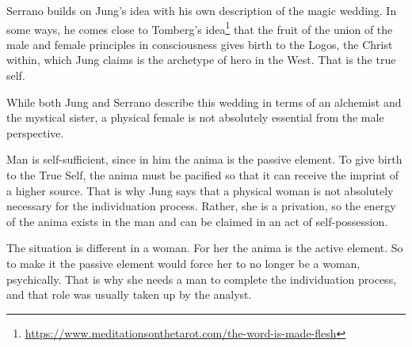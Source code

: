 Serrano builds on Jung's idea with his own description of the magic wedding. In some ways, he comes close to Tomberg's idea\footnote{\url{https://www.meditationsonthetarot.com/the-word-is-made-flesh}} that the fruit of the union of the male and female principles in consciousness gives birth to the Logos, the Christ within, which Jung claims is the archetype of hero in the West. That is the true self.

While both Jung and Serrano describe this wedding in terms of an alchemist and the mystical sister, a physical female is not absolutely essential from the male perspective.

Man is self-sufficient, since in him the anima is the passive element. To give birth to the True Self, the anima must be pacified so that it can receive the imprint of a higher source. That is why Jung says that a physical woman is not absolutely necessary for the individuation process. Rather, she is a privation, so the energy of the anima exists in the man and can be claimed in an act of self-possession.

The situation is different in a woman. For her the anima is the active element. So to make it the passive element would force her to no longer be a woman, psychically. That is why she needs a man to complete the individuation process, and that role was usually taken up by the analyst.




